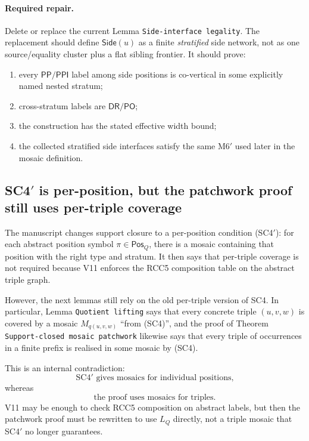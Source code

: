 \documentclass[11pt]{article}
\newcommand{\DR}{\mathsf{DR}}
\newcommand{\PO}{\mathsf{PO}}
\newcommand{\PP}{\mathsf{PP}}
\newcommand{\PPI}{\mathsf{PPI}}
\newcommand{\Pos}{\mathsf{Pos}}
\newcommand{\Side}{\mathsf{Side}}
\begin{document}
\paragraph{Required repair.}
Delete or replace the current Lemma \texttt{Side-interface legality}.  The
replacement should define $\Side(u)$ as a finite \emph{stratified} side network,
not as one source/equality cluster plus a flat sibling frontier.  It should prove:
\begin{enumerate}[leftmargin=2em,label=(S\arabic*)]
  \item every $\PP/\PPI$ label among side positions is co-vertical in some
        explicitly named nested stratum;
  \item cross-stratum labels are $\DR/\PO$;
  \item the construction has the stated effective width bound;
  \item the collected stratified side interfaces satisfy the same M6$'$ used
        later in the mosaic definition.
\end{enumerate}

\subsection{SC4$'$ is per-position, but the patchwork proof still uses per-triple coverage}
\label{ssec:sc4}

The manuscript changes support closure to a per-position condition (SC4$'$):
for each abstract position symbol $\pi\in\Pos_Q$, there is a mosaic containing
that position with the right type and stratum.  It then says that per-triple
coverage is not required because V11 enforces the RCC5 composition table on the
abstract triple graph.

However, the next lemmas still rely on the old per-triple version of SC4.  In
particular, Lemma \texttt{Quotient lifting} says that every concrete triple
$(u,v,w)$ is covered by a mosaic $M_{q(u,v,w)}$ ``from (SC4)'', and the proof of
Theorem \texttt{Support-closed mosaic patchwork} likewise says that every triple
of occurrences in a finite prefix is realised in some mosaic by (SC4).

This is an internal contradiction:
\[
  \text{SC4$'$ gives mosaics for individual positions,}
\]
whereas
\[
  \text{the proof uses mosaics for triples.}
\]
V11 may be enough to check RCC5 composition on abstract labels, but then the
patchwork proof must be rewritten to use $L_Q$ directly, not a triple mosaic
that SC4$'$ no longer guarantees.
\end{document}

